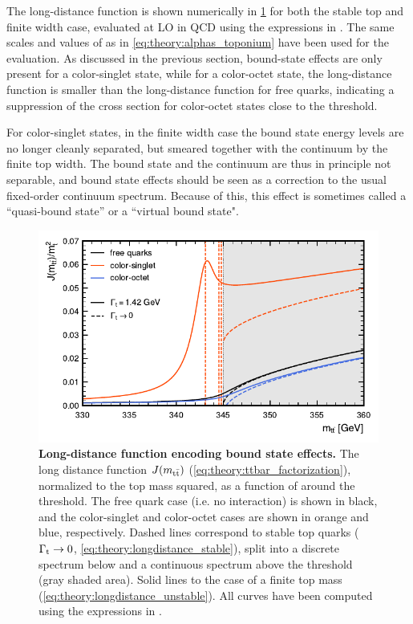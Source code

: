 The long-distance function is shown numerically in \cref{fig:theory:greensfunction} for both the stable top and finite width case, evaluated at LO in QCD using the expressions in . The same scales and values of \alphas as in \cref{eq:theory:alphas_toponium} have been used for the evaluation.
As discussed in the previous section, bound-state effects are only present for a color-singlet state, while for a color-octet state, the long-distance function is smaller than the long-distance function for free quarks, indicating a suppression of the cross section for color-octet states close to the threshold.

For color-singlet states, in the finite width case the bound state energy levels are no longer cleanly separated, but smeared together with the \ttbar continuum by the finite top width. The bound state and the \ttbar continuum are thus in principle not separable, and bound state effects should be seen as a correction to the usual fixed-order \ttbar continuum spectrum. Because of this, this effect is sometimes called a ``quasi-bound state'' or a ``virtual bound state".

\begin{figure}[t]
    \centering
    \includegraphics[width=0.85\linewidth]{figures/greensfunction.pdf}
    \caption{\textbf{Long-distance function encoding \ttbar bound state effects.} The long distance function $J(m_{\mathrm{t \bar{t}}})$ (\cref{eq:theory:ttbar_factorization}), normalized to the top mass squared, as a function of \mtt around the \ttbar threshold. The free quark case (i.e. no interaction) is shown in black, and the color-singlet and color-octet cases are shown in orange and blue, respectively. Dashed lines correspond to stable top quarks ($\Gamma_{\mathrm{t}} \rightarrow 0$, \cref{eq:theory:longdistance_stable}), split into a discrete spectrum below and a continuous spectrum above the \ttbar threshold (gray shaded area). Solid lines to the case of a finite top mass (\cref{eq:theory:longdistance_unstable}). All curves have been computed using the expressions in .}
    \label{fig:theory:greensfunction}
\end{figure}


